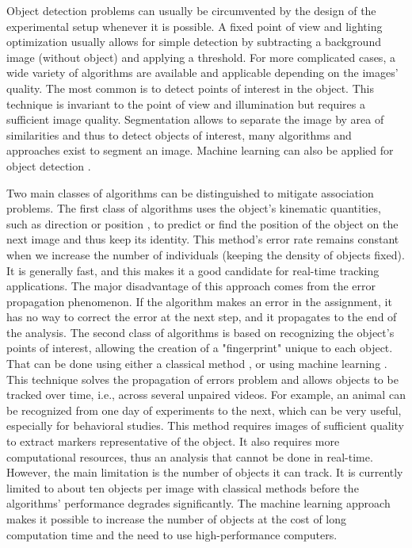     Object detection problems can usually be circumvented by the design of the experimental setup whenever it is possible. A fixed point of view and lighting optimization usually allows for simple detection by subtracting a background image (without object) and applying a threshold. For more complicated cases, a wide variety of algorithms are available \cite{yilmaz2006object} and applicable depending on the images' quality. The most common is to detect points of interest in the object. This technique is invariant to the point of view and illumination but requires a sufficient image quality. Segmentation allows to separate the image by area of similarities and thus to detect objects of interest, many algorithms and approaches exist to segment an image. Machine learning can also be applied for object detection \cite{zhao2019object}.

    Two main classes of algorithms can be distinguished to mitigate association problems. The first class of algorithms uses the object's kinematic quantities, such as direction or position \cite{qian2016effective}, to predict or find the position of the object on the next image and thus keep its identity. This method's error rate remains constant when we increase the number of individuals (keeping the density of objects fixed). It is generally fast, and this makes it a good candidate for real-time tracking applications. The major disadvantage of this approach comes from the error propagation phenomenon. If the algorithm makes an error in the assignment, it has no way to correct the error at the next step, and it propagates to the end of the analysis.
    The second class of algorithms is based on recognizing the object's points of interest, allowing the creation of a "fingerprint" unique to each object. That can be done using either a classical method \cite{perez2014idtracker, bai2018automatic}, or using machine learning \cite{mathis2018deeplabcut, romero2019idtracker}. This technique solves the propagation of errors problem and allows objects to be tracked over time, i.e., across several unpaired videos. For example, an animal can be recognized from one day of experiments to the next, which can be very useful, especially for behavioral studies. This method requires images of sufficient quality to extract markers representative of the object. It also requires more computational resources, thus an analysis that cannot be done in real-time. However, the main limitation is the number of objects it can track. It is currently limited to about ten objects per image with classical methods before the algorithms' performance degrades significantly. The machine learning approach makes it possible to increase the number of objects at the cost of long computation time and the need to use high-performance computers.

